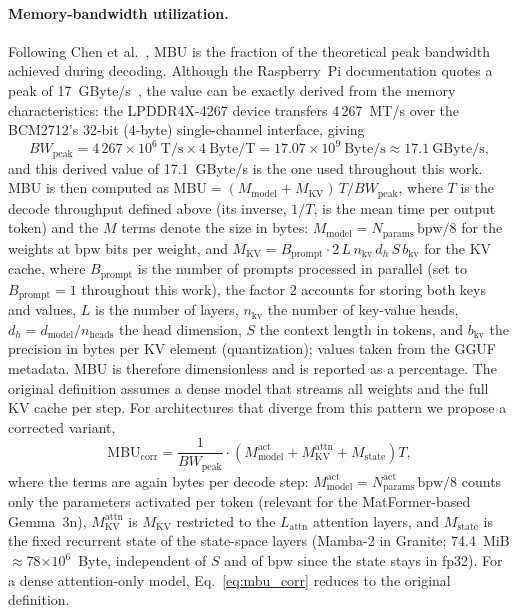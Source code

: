 \documentclass[acmsmall,natbib=false]{acmart}
\begin{document}
\paragraph{Memory-bandwidth utilization.}
Following Chen et al.~\cite{chen_inference_2025}, MBU is the fraction of the
theoretical peak bandwidth achieved during decoding. Although the
Raspberry~Pi documentation quotes a peak of
17~GByte/s~\cite{BCM2712Doc}, the value can be exactly derived from the memory
characteristics: the LPDDR4X-4267 device transfers 4\,267~MT/s over the
BCM2712's 32-bit (4-byte) single-channel interface, giving
\begin{equation}
  BW_{\mathrm{peak}} = 4\,267\times10^{6}~\mathrm{T/s} \times 4~\mathrm{Byte/T}
  = 17.07\times10^{9}~\mathrm{Byte/s} \approx 17.1~\mathrm{GByte/s},
  \label{eq:bw_peak}
\end{equation}
and this derived value of 17.1~GByte/s is the one used throughout this work.
MBU is then computed as
$\mathrm{MBU} = (M_{\mathrm{model}} + M_{\mathrm{KV}})\,T / BW_{\mathrm{peak}}$,
where $T$ is the decode throughput defined above (its inverse, $1/T$, is the
mean time per output token) and the $M$ terms denote the size in bytes: $M_{\mathrm{model}} = N_{\mathrm{params}}\,\mathrm{bpw}/8$
for the weights at $\mathrm{bpw}$ bits per weight, and
$M_{\mathrm{KV}} = B_{\mathrm{prompt}} \cdot 2 \, L \, n_{\mathrm{kv}}\, d_{h}\, S\, b_{\mathrm{kv}}$
for the KV cache, where $B_{\mathrm{prompt}}$ is the number of prompts
processed in parallel (set to $B_{\mathrm{prompt}}=1$ throughout this work),
the factor $2$ accounts for storing both keys and values, $L$ is the number
of layers, $n_{\mathrm{kv}}$ the number of key-value heads,
$d_{h}=d_{\mathrm{model}}/n_{\mathrm{heads}}$ the head dimension, $S$ the
context length in tokens, and $b_{\mathrm{kv}}$ the precision in bytes per
KV element (quantization); values taken from the GGUF metadata.
MBU is therefore dimensionless and is reported as a percentage. The
original definition assumes a dense model that streams all weights and the
full KV cache per step. For architectures that diverge from this pattern we
propose a corrected variant,
\begin{equation}
  \mathrm{MBU}_{\mathrm{corr}} = \frac{1}{BW_{\mathrm{peak}}}\cdot
  \left(M_{\mathrm{model}}^{\mathrm{act}} + M_{\mathrm{KV}}^{\mathrm{attn}} +
  M_{\mathrm{state}}\right) T,
  \label{eq:mbu_corr}
\end{equation}
where the terms are again bytes per decode step:
$M_{\mathrm{model}}^{\mathrm{act}} = N_{\mathrm{params}}^{\mathrm{act}}\,
\mathrm{bpw}/8$ counts only the parameters activated per token (relevant for
the MatFormer-based Gemma~3n), $M_{\mathrm{KV}}^{\mathrm{attn}}$ is
$M_{\mathrm{KV}}$ restricted to the $L_{\mathrm{attn}}$ attention layers, and
$M_{\mathrm{state}}$ is the fixed recurrent state of the state-space layers
(Mamba-2 in Granite; 74.4~MiB${}\approx{}$78$\times10^{6}$~Byte, independent of
$S$ and of $\mathrm{bpw}$ since the state stays in fp32). For a dense
attention-only model, Eq.~\eqref{eq:mbu_corr} reduces to the original
definition.
\end{document}
